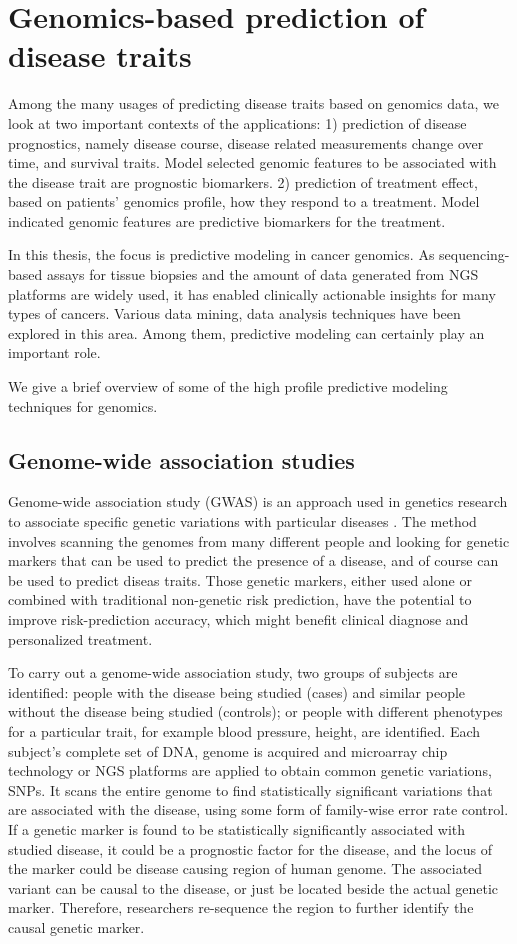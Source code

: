 \section{Genomics-based prediction of disease traits}
\label{sec:Prediction}
Among the many usages of predicting disease traits based on genomics data, we look at two important contexts of the applications: 1) prediction of disease prognostics, namely disease course, disease related measurements change over time, and survival traits. Model selected genomic features to be associated with the disease trait are prognostic biomarkers. 2) prediction of treatment effect, based on patients' genomics profile, how they respond to a treatment. Model indicated genomic features are predictive biomarkers for the treatment. 

In this thesis, the focus is predictive modeling in cancer genomics. As sequencing-based assays for tissue biopsies and the amount of data generated from NGS platforms are widely used, it has enabled clinically actionable insights for many types of cancers. Various data mining, data analysis techniques have been explored in this area. Among them, predictive modeling can certainly play an important role.

We give a brief overview of some of the high profile predictive modeling techniques for genomics. 

\subsection{Genome-wide association studies}
Genome-wide association study (GWAS) is an approach used in genetics research to associate specific genetic variations with particular diseases \citep{manolio2010genomewide}. The method involves scanning the genomes from many different people and looking for genetic markers that can be used to predict the presence of a disease, and of course can be used to predict diseas traits. Those genetic markers, either used alone or combined with traditional non-genetic risk prediction, have the potential to improve risk-prediction accuracy, which might beneﬁt clinical diagnose and personalized treatment.

To carry out a genome-wide association study, two groups of subjects are identified: people with the disease being studied (cases) and similar people without the disease being studied (controls); or people with different phenotypes for a particular trait, for example blood pressure, height, are identified. Each subject's complete set of DNA, genome is acquired and microarray chip technology or NGS platforms are applied to obtain common genetic variations, SNPs. It scans the entire genome to find statistically significant variations that are associated with the disease, using some form of family-wise error rate control. If a genetic marker is found to be statistically significantly associated with studied disease, it could be a prognostic factor for the disease, and the locus of the marker could be disease causing region of human genome. The associated variant can be causal to the disease, or just be located beside the actual genetic marker. Therefore, researchers re-sequence the region to further identify the causal genetic marker. 

